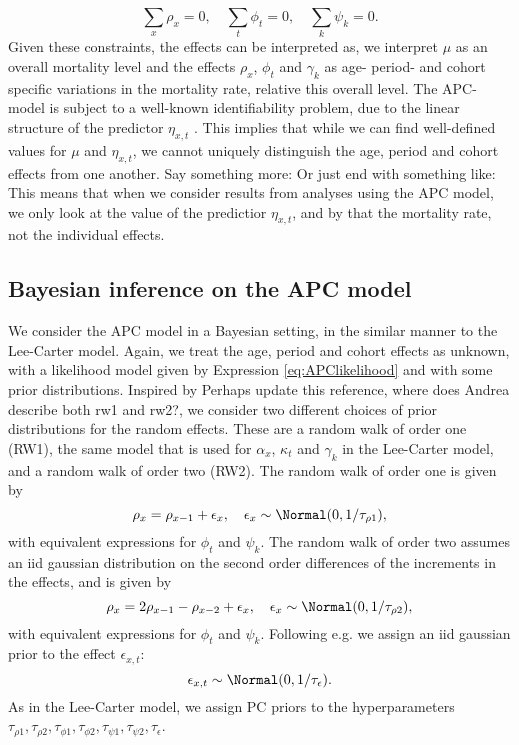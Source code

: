 \begin{equation}
    \sum_{x}\rho_x = 0, \quad \sum_{t}\phi_t = 0, \quad \sum_{k} \psi_k = 0. 
    \label{eq:APCconstraints}
\end{equation}
Given these constraints, the effects can be interpreted as, we interpret $\mu$ as an overall mortality level \cite{RieblerThesis2010} and the effects $\rho_x$, $\phi_t$ and $\gamma_k$ as age- period- and cohort specific variations in the mortality rate, relative this overall level. 
\newpar The APC-model is subject to a well-known identifiability problem, due to the linear structure of the predictor $\eta_{x,t}$ \cite{RieblerThesis2010}. This implies that while we can find well-defined values for $\mu$ and $\eta_{x,t}$, we cannot uniquely distinguish the age, period and cohort effects from one another. 
\textcolor{myDarkGreen}{Say something more: Or just end with something like: This means that when we consider results from analyses using the APC model, we only look at the value of the predictior $\eta_{x,t}$, and by that the mortality rate, not the individual effects. 
}

\subsection{Bayesian inference on the APC model}
We consider the APC model in a Bayesian setting, in the similar manner to the Lee-Carter model. Again, we treat the age, period and cohort effects as unknown, with a likelihood model given by Expression \ref{eq:APClikelihood} and with some prior distributions. Inspired by \cite{RieblerThesis2010} \textcolor{myDarkGreen}{Perhaps update this reference, where does Andrea describe both rw1 and rw2?}, we consider two different choices of prior distributions for the random effects. These are a random walk of order one (RW1), the same model that is used for $\alpha_x$, $\kappa_t$ and $\gamma_k$ in the Lee-Carter model, and a random walk of order two (RW2). The random walk of order one is given by
\begin{equation}
    \rho_x = \rho_{x-1} + \epsilon_x, \quad \epsilon_x \sim \Normal(0,1/\tau_{\rho1}),
\end{equation}
with equivalent expressions for $\phi_t$ and $\psi_k$. The random walk of order two assumes an iid gaussian distribution on the second order differences of the increments in the effects, and is given by
\begin{equation}
    \rho_x = 2\rho_{x-1} - \rho_{x-2} + \epsilon_x, \quad \epsilon_x \sim \Normal(0, 1/\tau_{\rho2}),
    \label{eq:APCrw2}
\end{equation}
with equivalent expressions for $\phi_t$ and $\psi_k$. 
Following e.g. \textcite{Besag1995} we assign an iid gaussian prior to the effect $\epsilon_{x,t}$:
\begin{equation}
    \epsilon_{x,t} \sim \Normal(0,1/\tau_\epsilon).
\end{equation}
As in the Lee-Carter model, we assign PC priors to the hyperparameters $\tau_{\rho 1}, \tau_{\rho 2}, \tau_{\phi 1}, \tau_{\phi 2}, \tau_{\psi 1}, \tau_{\psi 2}, \tau_\epsilon$. 


